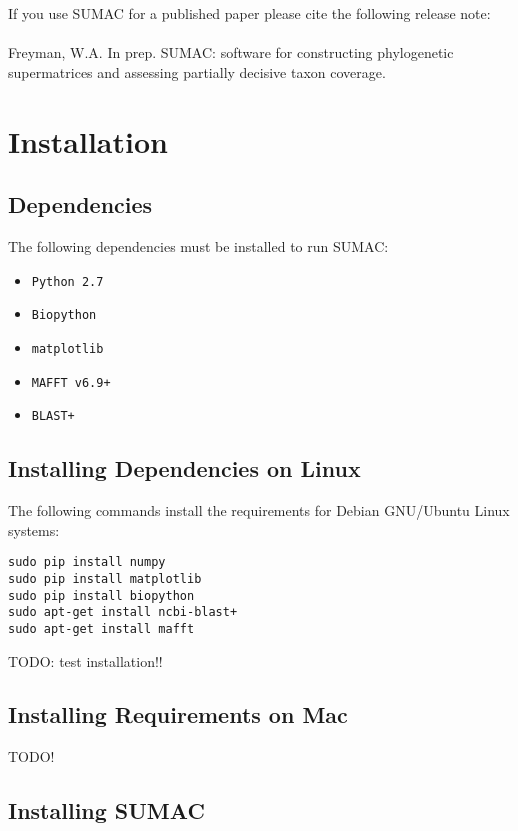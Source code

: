 \documentclass[10pt]{report}
\begin{document}
If you use SUMAC for a published paper please cite the following release note: \\
\\
Freyman, W.A. In prep. SUMAC: software for constructing phylogenetic supermatrices and assessing partially decisive taxon coverage.

\section{Installation}

\subsection{Dependencies}

The following dependencies must be installed to run SUMAC:

\begin{itemize}
\item \texttt{Python 2.7}
\item \texttt{Biopython}
\item \texttt{matplotlib}
\item \texttt{MAFFT v6.9+}
\item \texttt{BLAST+}
\end{itemize}

\subsection{Installing Dependencies on Linux}

The following commands install the requirements for Debian GNU/Ubuntu Linux systems:

\begin{verbatim}
sudo pip install numpy
sudo pip install matplotlib
sudo pip install biopython
sudo apt-get install ncbi-blast+
sudo apt-get install mafft
\end{verbatim}

TODO: test installation!!

\subsection{Installing Requirements on Mac}

TODO!

\subsection{Installing SUMAC}
\end{document}
